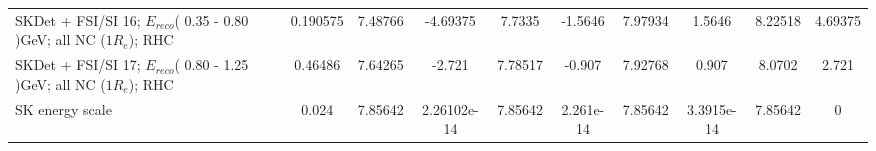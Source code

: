 \begin{tabular}{| l | S | S  S | S  S | S  S | S  S | }
         SKDet + FSI/SI 16; $E_{reco}$( 0.35 - 0.80 )GeV; all NC ($1R_{e}$); RHC &        0.190575 &         7.48766 &        -4.69375 &          7.7335 &         -1.5646 &         7.97934 &          1.5646 &         8.22518 &         4.69375 \\ 
         SKDet + FSI/SI 17; $E_{reco}$( 0.80 - 1.25 )GeV; all NC ($1R_{e}$); RHC &         0.46486 &         7.64265 &          -2.721 &         7.78517 &          -0.907 &         7.92768 &           0.907 &          8.0702 &           2.721 \\ 
                                                                 SK energy scale &           0.024 &         7.85642 &     2.26102e-14 &         7.85642 &       2.261e-14 &         7.85642 &      3.3915e-14 &         7.85642 &               0 \\ 
\bottomrule
\end{tabular}
